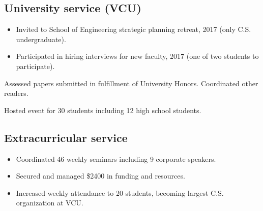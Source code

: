 \documentclass[11pt,letterpaper,serif]{moderncv}
\begin{document}
\subsection{University service (VCU)}
{
	\begin{adjustwidth}{.25in}{}
		\begin{itemize}%
			\item Invited to School of Engineering strategic planning retreat, 2017 (only C.S. undergraduate).
			\item Participated in hiring interviews for new faculty, 2017 (one of two students to participate).
		\end{itemize}
	\end{adjustwidth}
}

{
	\begin{adjustwidth}{.25in}{}
		Assessed papers submitted in fulfillment of University Honors. Coordinated other readers.
	\end{adjustwidth}
}




{
	\begin{adjustwidth}{.25in}{}
		Hosted event for 30 students including 12 high school students.
	\end{adjustwidth}
}

\subsection{Extracurricular service}
{
	\begin{adjustwidth}{.25in}{}
		\begin{itemize}
			\item Coordinated 46 weekly seminars including 9 corporate speakers.
			\item Secured and managed \$2400 in funding and resources.
			\item Increased weekly attendance to 20 students, becoming largest C.S. organization at VCU.
		\end{itemize}
	\end{adjustwidth}
}
\end{document}
